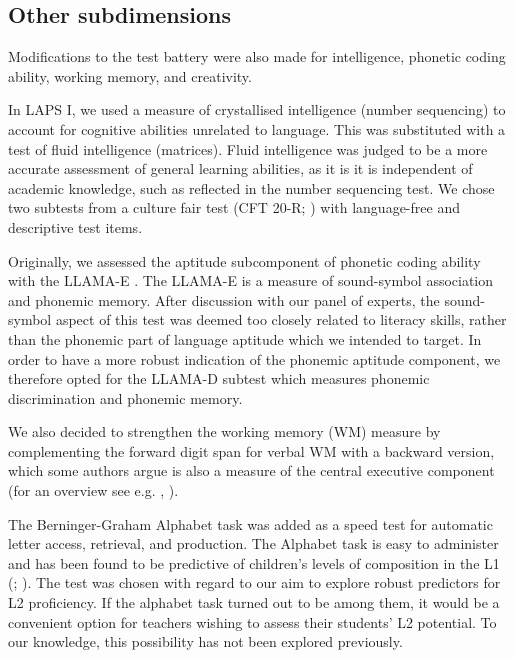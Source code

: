 \documentclass[output=paper]{langsci/langscibook}
\begin{document}
 \subsection{Other subdimensions}

Modifications to the test battery were also made for intelligence, phonetic coding ability, working memory, and creativity. 

In LAPS I, we used a measure of crystallised intelligence (number sequencing) to account for cognitive abilities unrelated to language. This was substituted with a test of fluid intelligence (matrices). Fluid intelligence was judged to be a more accurate assessment of general learning abilities, as it is it is independent of academic knowledge, such as reflected in the number sequencing test. We chose two subtests from a culture fair test (CFT 20-R; \citealt{Weiss2006}) with language-free and descriptive test items.

Originally, we assessed the aptitude subcomponent of phonetic coding ability with the LLAMA-E \citep{MearaEtAl2001}. The LLAMA-E is a measure of sound-symbol association and phonemic memory. After discussion with our panel of experts, the sound-symbol aspect of this test was deemed too closely related to literacy skills, rather than the phonemic part of language aptitude which we intended to target. In order to have a more robust indication of the phonemic aptitude component, we therefore opted for the LLAMA-D subtest \citep{MearaEtAl2001} which measures phonemic discrimination and phonemic memory. 

We also decided to strengthen the working memory (WM) measure by complementing the forward digit span for verbal WM with a backward version, which some authors argue is also a measure of the central executive component (for an overview see e.g. \citealt{St-ClairEtAl2013}, \citealt{HilbertEtAl2014}). 

The Berninger-Graham Alphabet task \citep{BerningerEtAl1992} was added as a speed test for automatic letter access, retrieval, and production. The Alphabet task is easy to administer and has been found to be predictive of children’s levels of composition in the L1 (\citealt{BerningerEtAl1997}; \citealt{GrahamEtAl2006}). The test was chosen with regard to our aim to explore robust predictors for L2 proficiency. If the alphabet task turned out to be among them, it would be a convenient option for teachers wishing to assess their students’ L2 potential. To our knowledge, this possibility has not been explored previously.
\end{document}
